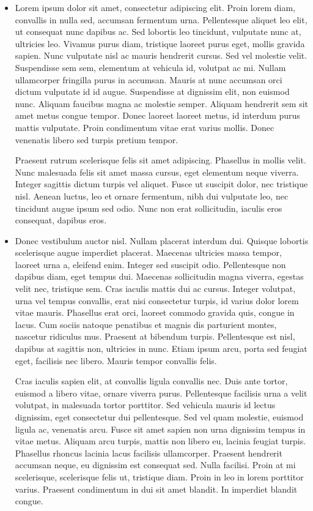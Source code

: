 \documentclass[10pt,]{article}
\theoremstyle{plain}
\theoremstyle{definition}
\theoremstyle{definition}
\theoremstyle{definition}
\theoremstyle{definition}
\theoremstyle{definition}
\theoremstyle{definition}
\numberwithin{equation}{section}
\begin{document}
\begin{multicols}{2}
\begin{itemize}[label=\textbullet]
\item{}\hypertarget{p-160}{}%
Lorem ipsum dolor sit amet, consectetur adipiscing elit. Proin lorem diam, convallis in nulla sed, accumsan fermentum urna. Pellentesque aliquet leo elit, ut consequat nunc dapibus ac. Sed lobortis leo tincidunt, vulputate nunc at, ultricies leo. Vivamus purus diam, tristique laoreet purus eget, mollis gravida sapien. Nunc vulputate nisl ac mauris hendrerit cursus. Sed vel molestie velit. Suspendisse sem sem, elementum at vehicula id, volutpat ac mi. Nullam ullamcorper fringilla purus in accumsan. Mauris at nunc accumsan orci dictum vulputate id id augue. Suspendisse at dignissim elit, non euismod nunc. Aliquam faucibus magna ac molestie semper. Aliquam hendrerit sem sit amet metus congue tempor. Donec laoreet laoreet metus, id interdum purus mattis vulputate. Proin condimentum vitae erat varius mollis. Donec venenatis libero sed turpis pretium tempor.%
\par
\hypertarget{p-161}{}%
Praesent rutrum scelerisque felis sit amet adipiscing. Phasellus in mollis velit. Nunc malesuada felis sit amet massa cursus, eget elementum neque viverra. Integer sagittis dictum turpis vel aliquet. Fusce ut suscipit dolor, nec tristique nisl. Aenean luctus, leo et ornare fermentum, nibh dui vulputate leo, nec tincidunt augue ipsum sed odio. Nunc non erat sollicitudin, iaculis eros consequat, dapibus eros.%
\item{}\hypertarget{p-162}{}%
Donec vestibulum auctor nisl. Nullam placerat interdum dui. Quisque lobortis scelerisque augue imperdiet placerat. Maecenas ultricies massa tempor, laoreet urna a, eleifend enim. Integer sed suscipit odio. Pellentesque non dapibus diam, eget tempus dui. Maecenas sollicitudin magna viverra, egestas velit nec, tristique sem. Cras iaculis mattis dui ac cursus. Integer volutpat, urna vel tempus convallis, erat nisi consectetur turpis, id varius dolor lorem vitae mauris. Phasellus erat orci, laoreet commodo gravida quis, congue in lacus. Cum sociis natoque penatibus et magnis dis parturient montes, nascetur ridiculus mus. Praesent at bibendum turpis. Pellentesque est nisl, dapibus at sagittis non, ultricies in nunc. Etiam ipsum arcu, porta sed feugiat eget, facilisis nec libero. Mauris tempor convallis felis.%
\par
\hypertarget{p-163}{}%
Cras iaculis sapien elit, at convallis ligula convallis nec. Duis ante tortor, euismod a libero vitae, ornare viverra purus. Pellentesque facilisis urna a velit volutpat, in malesuada tortor porttitor. Sed vehicula mauris id lectus dignissim, eget consectetur dui pellentesque. Sed vel quam molestie, euismod ligula ac, venenatis arcu. Fusce sit amet sapien non urna dignissim tempus in vitae metus. Aliquam arcu turpis, mattis non libero eu, lacinia feugiat turpis. Phasellus rhoncus lacinia lacus facilisis ullamcorper. Praesent hendrerit accumsan neque, eu dignissim est consequat sed. Nulla facilisi. Proin at mi scelerisque, scelerisque felis ut, tristique diam. Proin in leo in lorem porttitor varius. Praesent condimentum in dui sit amet blandit. In imperdiet blandit congue.%

\end{itemize}
\end{multicols}
\end{document}
